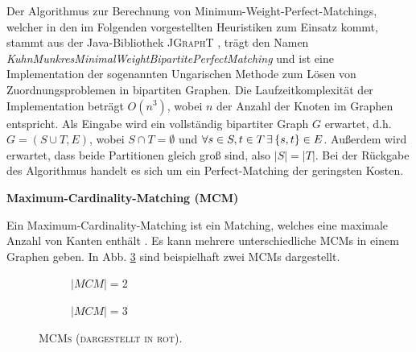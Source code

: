 Der Algorithmus zur Berechnung von Minimum-Weight-Perfect-Matchings, welcher in den im Folgenden
vorgestellten Heuristiken zum Einsatz kommt, stammt aus der Java-Bibliothek \textsc{JGraphT} \cite{JGraphT}, trägt
den Namen \textit{KuhnMunkresMinimalWeightBipartitePerfectMatching} und ist eine Implementation der
sogenannten Ungarischen Methode zum Lösen von Zuordnungsproblemen in bipartiten Graphen.
Die Laufzeitkomplexität der Implementation beträgt $O(n^3)$, wobei $n$ der Anzahl der Knoten im Graphen entspricht.
Als Eingabe wird ein vollständig bipartiter Graph $G$ erwartet, d.h. $G= (S \cup T, E)$, wobei $S \cap T = \emptyset$ und
$\forall s \in S, t \in T \thinspace \exists \thinspace \{s, t\} \in E$. Außerdem wird erwartet, dass beide Partitionen gleich groß sind,
also $|S| = |T|$. Bei der Rückgabe des Algorithmus handelt es sich um ein Perfect-Matching der geringsten Kosten.

\textbf{Maximum-Cardinality-Matching (MCM)}

Ein Maximum-Cardinality-Matching ist ein Matching, welches eine maximale Anzahl von Kanten enthält \cite{Gibbons1985}.
Es kann mehrere unterschiedliche MCMs in einem Graphen geben.
In Abb. \ref{fig:mcm_examples} sind beispielhaft zwei MCMs dargestellt.

\begin{figure}[H]
  \begin{subfigure}[b]{0.4\textwidth}
  \centering
  \caption{\textsc{$|MCM| = 2$}}
  \label{fig:mcm1}
  \end{subfigure}
  \hfill
  \begin{subfigure}[b]{0.4\textwidth}
  \centering
    \caption{\textsc{$|MCM| = 3$}}
    \label{fig:mcm_2}
  \end{subfigure}
  \caption{\textsc{MCMs (dargestellt in rot).}}
  \label{fig:mcm_examples}
\end{figure}

